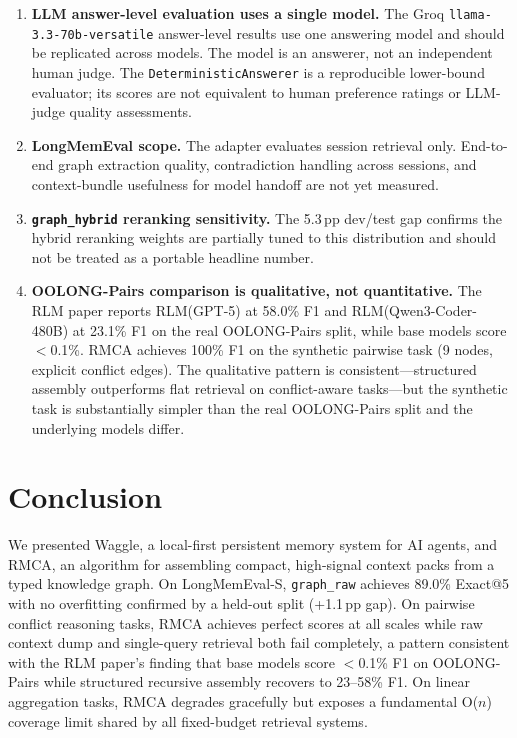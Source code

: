 \documentclass[conference]{IEEEtran}
\begin{document}
\begin{enumerate}
\item \textbf{LLM answer-level evaluation uses a single model.}
The Groq \texttt{llama-3.3-70b-versatile} answer-level results use one answering model and
should be replicated across models. The model is an answerer, not an independent human
judge. The \texttt{DeterministicAnswerer} is a reproducible lower-bound evaluator; its
scores are not equivalent to human preference ratings or LLM-judge quality assessments.

\item \textbf{LongMemEval scope.} The adapter evaluates session retrieval only. End-to-end
graph extraction quality, contradiction handling across sessions, and context-bundle
usefulness for model handoff are not yet measured.

\item \textbf{\texttt{graph\_hybrid} reranking sensitivity.} The 5.3\,pp dev/test gap
confirms the hybrid reranking weights are partially tuned to this distribution and should
not be treated as a portable headline number.

\item \textbf{OOLONG-Pairs comparison is qualitative, not quantitative.}
The RLM paper reports RLM(GPT-5) at 58.0\% F1 and RLM(Qwen3-Coder-480B) at 23.1\% F1 on
the real OOLONG-Pairs split, while base models score $<$0.1\%. RMCA achieves 100\% F1 on
the synthetic pairwise task (9 nodes, explicit conflict edges). The qualitative pattern is
consistent---structured assembly outperforms flat retrieval on conflict-aware tasks---but
the synthetic task is substantially simpler than the real OOLONG-Pairs split and the
underlying models differ.
\end{enumerate}

\section{Conclusion}

We presented Waggle, a local-first persistent memory system for AI agents, and RMCA, an
algorithm for assembling compact, high-signal context packs from a typed knowledge graph.
On LongMemEval-S, \texttt{graph\_raw} achieves 89.0\% Exact@5 with no overfitting confirmed
by a held-out split (+1.1\,pp gap). On pairwise conflict reasoning tasks, RMCA achieves
perfect scores at all scales while raw context dump and single-query retrieval both fail
completely, a pattern consistent with the RLM paper's finding that base models score
$<$0.1\% F1 on OOLONG-Pairs while structured recursive assembly recovers to 23--58\% F1.
On linear aggregation tasks, RMCA degrades gracefully but exposes a fundamental O($n$)
coverage limit shared by all fixed-budget retrieval systems.
\end{document}
